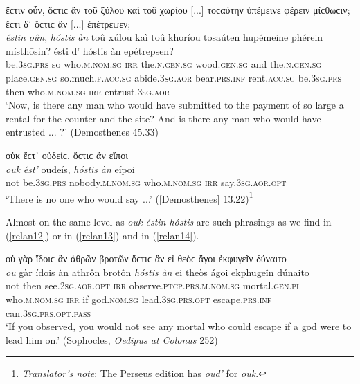 \begin{exe}
\ex ἔϲτιν οὖν, ὅϲτιϲ ἂν τοῦ ξύλου καὶ τοῦ χωρίου {[}...{]} τοϲαύτην ὑπέμεινε φέρειν μίϲθωϲιν; ἔϲτι δ᾽ ὅϲτιϲ ἂν {[}...{]} ἐπέτρεψεν;\\
\gll \emph{éstin} \emph{oûn}, \emph{hóstis} \emph{àn} toû xúlou kaì toû khōríou tosaútēn hupémeine phérein místhōsin? ésti d' hóstis àn epétrepsen?\\
be.\textsc{3sg.prs} so who.\textsc{m.nom.sg} \textsc{irr} the.\textsc{n.gen.sg} wood.\textsc{gen.sg} and the.\textsc{n.gen.sg} place.\textsc{gen.sg} so.much.\textsc{f.acc.sg} abide.\textsc{3sg.aor} bear.\textsc{prs.inf} rent.\textsc{acc.sg} be.\textsc{3sg.prs} then who.\textsc{m.nom.sg} \textsc{irr}
entrust.\textsc{3sg.aor}\\
\trans `Now, is there any man who would have submitted to the payment of so large a rental for the counter and the site? And is there any man who would have entrusted ... ?' (Demosthenes 45.33)
\label{relan10}
\end{exe}

\begin{exe}
\ex οὐκ ἔϲτ᾽ οὐδείϲ, ὅϲτιϲ ἂν εἴποι\\
\gll \emph{ouk} \emph{ést'} oudeís, \emph{hóstis} \emph{àn} eípoi\\
not be.\textsc{3sg.prs} nobody.\textsc{m.nom.sg} who.\textsc{m.nom.sg} \textsc{irr} say.\textsc{3sg.aor.opt}\\
\trans `There is no one who would say ...' ({[}Demosthenes{]} 13.22)\footnote{\emph{Translator's note}: The Perseus edition has \textit{oud'} for \textit{ouk}.}
\label{relan11}
\end{exe}

Almost on the same level as \emph{ouk éstin hóstis} are such phrasings as we find in (\ref{relan12}) or in (\ref{relan13}) and in (\ref{relan14}).

\begin{exe}
\ex οὐ γὰρ ἴδοιϲ ἂν ἀθρῶν βροτῶν ὅϲτιϲ ἂν εἰ θεὸϲ ἄγοι ἐκφυγεῖν δύναιτο\\
\gll \emph{ou} gàr ídois àn athrôn brotôn \emph{hóstis} \emph{àn} ei theòs ágoi ekphugeîn dúnaito\\
not then see.\textsc{2sg.aor.opt} \textsc{irr} observe.\textsc{ptcp.prs.m.nom.sg} mortal.\textsc{gen.pl} who.\textsc{m.nom.sg} \textsc{irr} if god.\textsc{nom.sg} lead.\textsc{3sg.prs.opt} escape.\textsc{prs.inf} can.\textsc{3sg.prs.opt.pass}\\
\trans `If you observed, you would not see any mortal who could escape if a god were to lead him on.' (Sophocles, \textit{Oedipus at Colonus} 252)
\label{relan12}
\end{exe}

